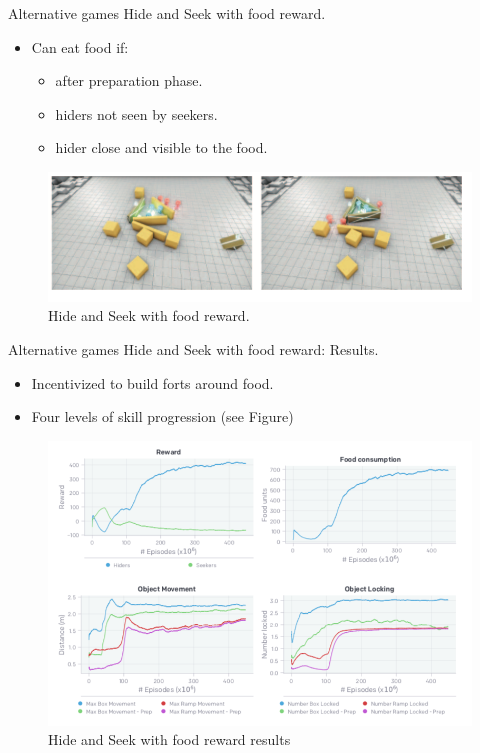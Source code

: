 \documentclass[9pt, hyperref={pdfusetitle,colorlinks=true,allcolors=DarkBlue}]{beamer}
\begin{document}
\begin{frame}{Alternative games}
Hide and Seek with food reward.
    \begin{itemize}
        \item Can eat food if:
        \begin{itemize}
            \item after preparation phase.
            \item hiders not seen by seekers.
            \item hider close and visible to the food.
        \end{itemize}{}
    \end{itemize}{}
    \begin{figure}
        \centering
        \includegraphics[scale=0.4]{FigureA6.png}
        \caption{Hide and Seek with food reward.}
    \end{figure}{}
\end{frame}{}
\begin{frame}{Alternative games}
Hide and Seek with food reward: Results.
    \begin{itemize}
        \item Incentivized to build forts around food.
        \item Four levels of skill progression (see Figure)
    \end{itemize}{}
    \begin{figure}
        \centering
        \includegraphics[scale=0.25]{FigureA7.png}
        \caption{Hide and Seek with food reward results}
    \end{figure}{}
\end{frame}{}
\end{document}
